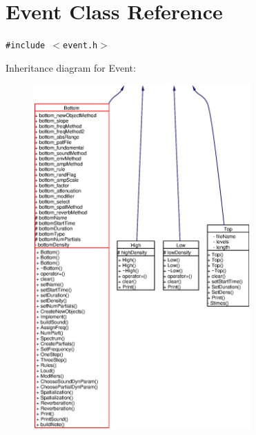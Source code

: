 \section{Event Class Reference}
\label{classEvent}
{\tt \#include $<$event.h$>$}

Inheritance diagram for Event:\begin{figure}[H]
\begin{center}
\leavevmode
\includegraphics[width=236pt]{classEvent__inherit__graph}
\end{center}
\end{figure}
